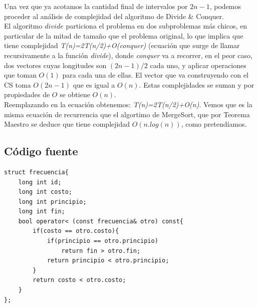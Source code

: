 Una vez que ya acotamos la cantidad final de intervalos por $2n-1$, podemos proceder al an\'alisis de complejidad del algoritmo de Divide \& Conquer.\\

El algoritmo $divide$ particiona el problema en dos subproblemas m\'as chicos, en particular de la mitad de tamaño que el problema original, lo que implica que tiene complejidad \emph{T(n)=2T(n/2)+O(conquer)} (ecuación que surge de llamar recursivamente a la función \emph{divide}), donde \emph{conquer} va a recorrer, en el peor caso, dos vectores cuyas longitudes son $(2n-1)/2$ cada uno, y aplicar operaciones que toman $O(1)$ para cada una de ellas. El vector que va construyendo con el CS toma $O(2n-1)$ que es igual a $O(n)$. Estas complejidades se suman y por propiedades de $O$ se obtiene $O(n)$.\\

Reemplazando en la ecuaci\'on obtenemos: \emph{T(n)=2T(n/2)+O(n)}. Vemos que es la misma ecuaci\'on de recurrencia que el algortimo de MergeSort, que por Teorema Maestro se deduce que tiene complejidad $O(n.log(n))$, como pretend\'iamos.

\newpage
\subsection{C\'odigo fuente}



	\begin{codesnippet}
	\begin{verbatim}
struct frecuencia{
    long int id;
    long int costo;
    long int principio;
    long int fin;
    bool operator< (const frecuencia& otro) const{
        if(costo == otro.costo){
            if(principio == otro.principio)
                return fin > otro.fin;
            return principio < otro.principio;
        }
        return costo < otro.costo;
    }
};
	\end{verbatim}
	\end{codesnippet}
	
